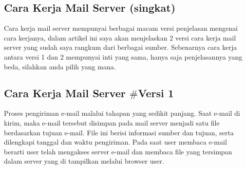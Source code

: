 \begin{enumerate}
\subsection {Cara Kerja Mail Server (singkat)} Cara kerja mail server mempunyai berbagai macam versi penjelasan mengenai cara kerjanya, dalam artikel ini saya akan menjelaskan 2 versi cara kerja mail server yang sudah saya rangkum dari berbagai sumber. Sebenarnya cara kerja antara versi 1 dan 2 mempunyai inti yang sama, hanya saja penjelasannya yang beda, silahkan anda pilih yang mana.  
\subsection {Cara Kerja Mail Server  $  \#  $Versi 1} \par
Proses pengiriman e-mail malalui tahapan yang sedikit panjang. Saat e-mail di kirim, maka e-mail tersebut disimpan pada mail server menjadi satu file berdasarkan tujuan e-mail. File ini berisi informasi sumber dan tujuan, serta dilengkapi tanggal dan waktu pengiriman. Pada saat user membaca e-mail berarti user telah mengakses server e-mail dan membaca file yang tersimpan dalam server yang di tampilkan melalui browser user. \par
\vspace{12pt}
\noindent 

\end{enumerate}
